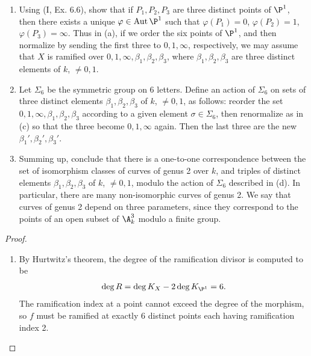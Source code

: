\documentclass[a4paper]{article}
\begin{document}
\begin{enumerate} [label=\textbf{\arabic*.}, leftmargin=0em]
\begin{enumerate} [label=(\alph*)]
          \item Using (I, Ex. 6.6), show that if $P_1, P_2, P_3$ are three distinct points of $\P^1$, then there exists a unique $\varphi \in \Aut{\P^1}$ such that $\varphi(P_1) = 0$, $\varphi(P_2) = 1$, $\varphi(P_3) = \infty$.
                Thus in (a), if we order the six points of $\P^1$, and then normalize by sending the first three to $0, 1, \infty$, respectively, we may assume that $X$ is ramified over $0, 1, \infty, \beta_1, \beta_2, \beta_3$, where $\beta_1, \beta_2, \beta_3$ are three distinct elements of $k$, $\neq 0, 1$.

          \item Let $\Sigma_6$ be the symmetric group on 6 letters.
                Define an action of $\Sigma_6$ on sets of three distinct elements $\beta_1, \beta_2, \beta_3$ of $k$, $\neq 0, 1$, as follows: reorder the set $0, 1, \infty, \beta_1, \beta_2, \beta_3$ according to a given element $\sigma \in \Sigma_6$, then renormalize as in (c) so that the three become $0, 1, \infty$ again.
                Then the last three are the new $\beta_1', \beta_2', \beta_3'$.

          \item Summing up, conclude that there is a one-to-one correspondence between the set of isomorphism classes of curves of genus 2 over $k$, and triples of distinct elements $\beta_1, \beta_2, \beta_3$ of $k$, $\neq 0, 1$, modulo the action of $\Sigma_6$ described in (d).
                In particular, there are many non-isomorphic curves of genus 2.
                We say that curves of genus 2 depend on three parameters, since they correspond to the points of an open subset of $\A_k^3$ modulo a finite group.
        \end{enumerate}

        \begin{proof} $ $ \vspace{0pt}
          \begin{enumerate} [leftmargin=0cm]
            \item By Hurtwitz's theorem, the degree of the ramification divisor is computed to be
                  \begin{equation*}
                    \deg{R} = \deg{K_X} - 2 \deg{K_{\P^1}} = 6.
                  \end{equation*}
                  The ramification index at a point cannot exceed the degree of the morphism, so $f$ must be ramified at exactly 6 distinct points each having ramification index 2.


\end{enumerate}
\end{proof}
\end{enumerate}
\end{document}
